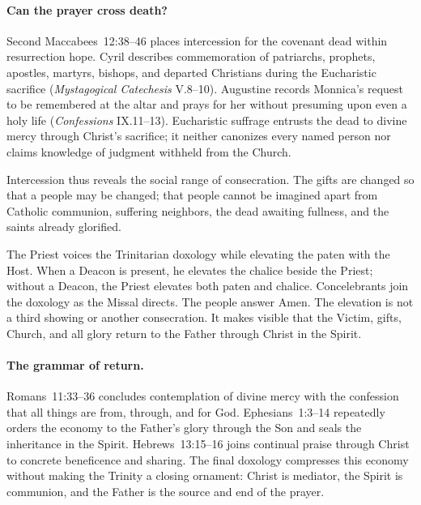 \paragraph{Can the prayer cross death?}
Second Maccabees~12:38--46 places intercession for the covenant dead within resurrection hope. Cyril describes commemoration of patriarchs, prophets, apostles, martyrs, bishops, and departed Christians during the Eucharistic sacrifice (\emph{Mystagogical Catechesis} V.8--10). Augustine records Monnica's request to be remembered at the altar and prays for her without presuming upon even a holy life (\emph{Confessions} IX.11--13). Eucharistic suffrage entrusts the dead to divine mercy through Christ's sacrifice; it neither canonizes every named person nor claims knowledge of judgment withheld from the Church.

Intercession thus reveals the social range of consecration. The gifts are changed so that a people may be changed; that people cannot be imagined apart from Catholic communion, suffering neighbors, the dead awaiting fullness, and the saints already glorified.


The Priest voices the Trinitarian doxology while elevating the paten with the Host. When a Deacon is present, he elevates the chalice beside the Priest; without a Deacon, the Priest elevates both paten and chalice. Concelebrants join the doxology as the Missal directs. The people answer Amen. The elevation is not a third showing or another consecration. It makes visible that the Victim, gifts, Church, and all glory return to the Father through Christ in the Spirit.

\paragraph{The grammar of return.}
Romans~11:33--36 concludes contemplation of divine mercy with the confession that all things are from, through, and for God. Ephesians~1:3--14 repeatedly orders the economy to the Father's glory through the Son and seals the inheritance in the Spirit. Hebrews~13:15--16 joins continual praise through Christ to concrete beneficence and sharing. The final doxology compresses this economy without making the Trinity a closing ornament: Christ is mediator, the Spirit is communion, and the Father is the source and end of the prayer.

